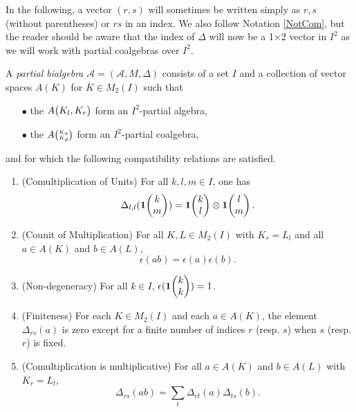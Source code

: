 In the following, a vector $(r,s)$ will sometimes be written simply as $r,s$ (without parentheses) or $rs$ in an index. We also follow Notation \ref{NotCom}, but the reader should be aware that the index of $\Delta$ will now be a 1$\times$2 vector in $I^2$ as we will work with partial coalgebras over $I^2$.%
%
\begin{Def}\label{DefPartBiAlg} A \emph{partial bialgebra} $\mathscr{A}=(\mathscr{A},M,\Delta)$ consists of a set $I$ and a collection of vector spaces $A(K)$ for $K\in M_2(I)$ such that 
\begin{itemize}
\item[$\bullet$] the $A{\begin{pmatrix} K_l, K_r\end{pmatrix}}$ form an $I^2$-partial algebra,
\item[$\bullet$] the $A{\tiny {\begin{pmatrix} K_u\\K_d\end{pmatrix}}}$ form an $I^2$-partial coalgebra,
\end{itemize} 
and for which the following compatibility relations are satisfied.
\begin{enumerate}[label=(\alph*)]
\item\label{Propa} (Comultiplication of Units) For all $k,l,m\in I$, one has 
\[\Delta_{l,l}(\mathbf{1}\!\begin{pmatrix} k \\ m\end{pmatrix}) = \mathbf{1}\!\begin{pmatrix} k \\ l\end{pmatrix}\otimes \mathbf{1}\!\begin{pmatrix} l \\ m\end{pmatrix}.\]  
\item\label{Propb} (Counit of Multiplication) For all $K,L\in M_2(I)$ with $K_r = L_l$ and all $a\in A(K)$ and $b\in A(L)$, \[\epsilon(ab) = \epsilon(a)\epsilon(b).\]%
\item\label{Propc} (Non-degeneracy) For all $k\in I$, $\epsilon(\mathbf{1}\!\begin{pmatrix} k \\ k\end{pmatrix})=1$. 
\item\label{Propd} (Finiteness) For each $K\in M_2(I)$ and each $a\in A(K)$, the element $\Delta_{rs}(a)$ is zero except for a finite number of indices $r$ (resp. $s$) when $s$ (resp. $r$) is fixed.
\item\label{Prope} (Comultiplication is multiplicative) For all $a\in A(K)$ and $b\in A(L)$ with $K_r= L_l$,  \[\Delta_{rs}(ab) = \sum_t \Delta_{rt}(a)\Delta_{ts}(b).\]
\end{enumerate}
\end{Def}

